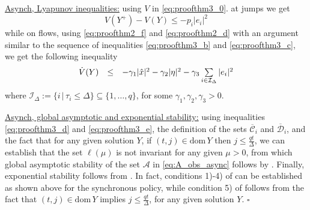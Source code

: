 \documentclass[twocolumn]{autart}
\newenvironment{proofof}{\noindent {\em Proof of }}{\hfill \hspace*{1pt}
\hfill $\square$}
\newcommand{\dom}{\mathrm{dom}}
\begin{document}
\begin{proofof}{\emph{Theorem \ref{thm:GASoutput}}.}
{ \underline{Asynch, Lyapunov inequalities:}} 
using $V$ in \eqref{eq:proofthm3_0}. at jumps we get
\begin{equation}
\label{eq:proofthm3_d}
 V(Y^+) - V(Y)\leq -p_i |e_i|^2  
\end{equation}
while on flows, using \eqref{eq:proofthm2_f} and \eqref{eq:proofthm2_d}
with an argument similar to the sequence of inequalities 
\eqref{eq:proofthm3_b} and \eqref{eq:proofthm3_c},
we get the following inequality
\begin{equation}
\label{eq:proofthm3_e}
 \begin{array}{lll}
  \dot{V}(Y) 
&\leq&  -\gamma_1 |\hat{x}|^2 -\gamma_2 |\eta|^2  
        -\gamma_3 \sum\nolimits\limits_{i\in \mathcal{I}_\Delta} |e_i|^2
 \end{array}
\end{equation}
where $\mathcal{I}_{\Delta}:=\{i\,|\, \tau_i \leq \Delta\}\subseteq \{1,\dots,q\}$,
for some $\gamma_1,\gamma_2,\gamma_3 >0$.

{ \underline{Asynch, global asymptotic and exponential stability:}} 
using inequalities \eqref{eq:proofthm3_d} and \eqref{eq:proofthm3_e},
the definition of the sets $\overline{\mathcal{C}}_i$ and $\overline{\mathcal{D}}_i$,
and the fact that for any given solution $Y$, if $(t,j)\in\dom\,Y$ then 
$j\leq \frac{qt}{\Delta}$, we can establish that the set $\ell(\mu)$ is not invariant
for any given $\mu>0$, from which global asymptotic stability of the set $\mathcal{A}$
in \eqref{eq:A_obs_async} follows by \cite[Theorem 23]{GoebelCSM09}.
Finally, exponential stability follows from \cite[Theorem 2]{TeelTAC13}.
In fact, conditions 1)-4) of \cite[Assumption 1]{TeelTAC13} can be established 
as shown above for the synchronous policy, while condition 5) of \cite[Assumption 1]{TeelTAC13}
follows from the fact that $(t,j)\in\dom\,Y$ implies $j\leq \frac{qt}{\Delta}$, for any given solution $Y$. 
\end{proofof}
\end{document}
